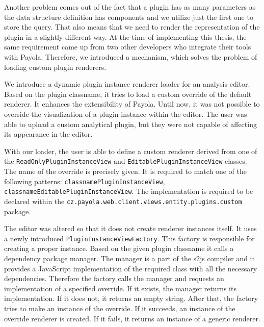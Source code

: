Another problem comes out of the fact that a plugin has as many parameters as 
the data structure definition has components and we utilize just the first one 
to store the query. That also means that we need to render the representation 
of the plugin in a slightly different way. At the time of implementing this 
thesis, the same requirement came up from two other developers who integrate their 
tools with Payola. Therefore, we introduced a mechanism, which solves the 
problem of loading custom plugin renderers.

We introduce a dynamic plugin instance renderer loader for an analysis editor. 
Based on the plugin classname, it tries to load a custom override of the default 
renderer. It enhances the extensibility of Payola. Until now, it was not 
possible to override the visualization of a plugin instance within the editor. The 
user was able to upload a custom analytical plugin, but they were not capable of affecting its
appearance in the editor.

\begin{sloppypar}
With our loader, the user is able to define a custom renderer derived from 
one of the \texttt{ReadOnlyPluginInstanceView} and \texttt{EditablePluginInstanceView} 
classes. The name of the override is precisely given. It is required to match one 
of the following patterns: \texttt{{classname}PluginInstanceView},
\texttt{{classname}EditablePluginInstanceView}. The implementation is required to
be declared within the \texttt{cz.payola.web.client.views.entity.plugins.custom} package.
\end{sloppypar}

\begin{sloppypar}
The editor was altered so that it does not create renderer instances itself. It 
uses a newly introduced \texttt{PluginInstanceViewFactory}. This 
factory is responsible for creating a proper instance. Based on the given plugin 
classname it calls a dependency package manager. The manager is a part of the 
s2js compiler and it provides a JavaScript implementation of the required class
with all the necessary dependencies. Therefore the factory calls the manager and 
requests an implementation of a specified override. If it exists, the manager 
returns its implementation. If it does not, it returns an empty string. After 
that, the factory tries to make an instance of the override. If it succeeds, an 
instance of the override renderer is created. If it fails, it returns an 
instance of a generic renderer. 
\end{sloppypar}
 
